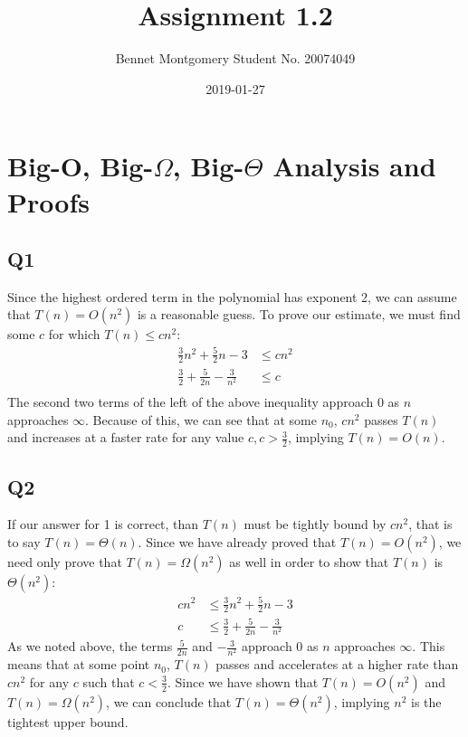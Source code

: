 \documentclass{article}
\title{Assignment 1.2}
\date{2019-01-27}
\author{Bennet Montgomery Student No. 20074049}
\begin{document}
	\maketitle
	
	\newpage
	
	
	\section{Big-O, Big-$\Omega$, Big-$\Theta$ Analysis and Proofs}
		\subsection*{Q1}
		Since the highest ordered term in the polynomial has exponent 2, we can assume that $T(n) = O(n^2)$ is a reasonable guess. To prove our estimate, we must find some $c$ for which $T(n) \leq cn^2$:
			\begin{align*}
				\frac{3}{2}n^2+\frac{5}{2}n - 3 &\leq cn^2\\
				\frac{3}{2} + \frac{5}{2n} - \frac{3}{n^2} &\leq c\\
			\end{align*}
		The second two terms of the left of the above inequality approach 0 as $n$ approaches $\infty$. Because of this, we can see that at some $n_0$, $cn^2$ passes $T(n)$ and increases at a faster rate for any value $c, c > \frac{3}{2}$, implying $T(n) = O(n)$.
		
		\subsection*{Q2}
		If our answer for 1 is correct, than $T(n)$ must be tightly bound by $cn^2$, that is to say $T(n) = \Theta(n)$. Since we have already proved that $T(n) = O(n^2)$, we need only prove that $T(n) = \Omega(n^2)$ as well in order to show that $T(n)$ is $\Theta(n^2)$:
			\begin{align*}
				cn^2 &\leq \frac{3}{2}n^2 + \frac{5}{2}n - 3\\
				c &\leq \frac{3}{2} + \frac{5}{2n} - \frac{3}{n^2}
			\end{align*}
		As we noted above, the terms $\frac{5}{2n}$ and $-\frac{3}{n^2}$ approach 0 as $n$ approaches $\infty$. This means that at some point $n_0$, $T(n)$ passes and accelerates at a higher rate than $cn^2$ for any $c$ such that $c < \frac{3}{2}$. Since we have shown that $T(n) = O(n^2)$ and $T(n) = \Omega(n^2)$, we can conclude that $T(n) = \Theta(n^2)$, implying $n^2$ is the tightest upper bound.
		
\end{document}
